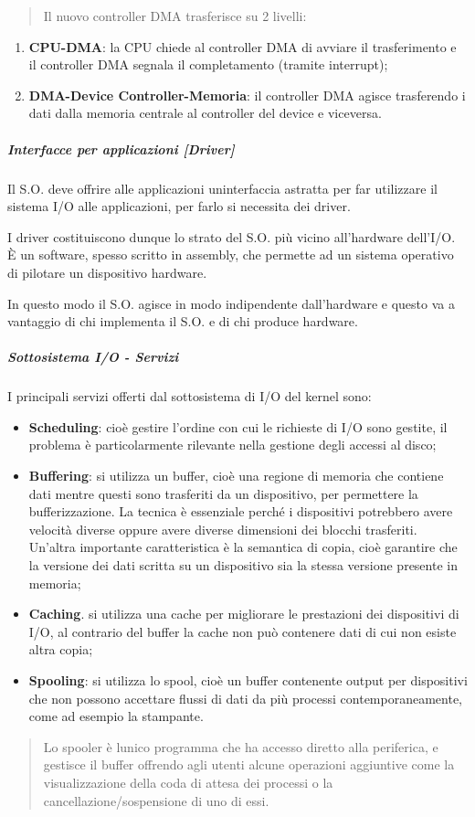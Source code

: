 \begin{quote}
Il nuovo controller DMA trasferisce su 2 livelli:
\end{quote}

\begin{enumerate}
\def\labelenumi{\arabic{enumi}.}
\item
  \textbf{CPU-DMA}: la CPU chiede al controller DMA di avviare il
  trasferimento e il controller DMA segnala il completamento (tramite
  interrupt);
\item
  \textbf{DMA-Device Controller-Memoria}: il controller DMA agisce
  trasferendo i dati dalla memoria centrale al controller del device e
  viceversa.
\end{enumerate}

\subparagraph{Interfacce per applicazioni
{[}Driver{]}}\label{interfacce-per-applicazioni-driver}

Il S.O. deve offrire alle applicazioni un\textquotesingle interfaccia
astratta per far utilizzare il sistema I/O alle applicazioni, per farlo
si necessita dei driver.

I driver costituiscono dunque lo strato del S.O. più vicino all'hardware
dell'I/O. È un software, spesso scritto in assembly, che permette ad un
sistema operativo di pilotare un dispositivo hardware.

In questo modo il S.O. agisce in modo indipendente dall'hardware e
questo va a vantaggio di chi implementa il S.O. e di chi produce
hardware.

\subparagraph{Sottosistema I/O -
Servizi}\label{sottosistema-io---servizi}

I principali servizi offerti dal sottosistema di I/O del kernel sono:

\begin{itemize}
\item
  \textbf{Scheduling}: cioè gestire l'ordine con cui le richieste di I/O
  sono gestite, il problema è particolarmente rilevante nella gestione
  degli accessi al disco;
\item
  \textbf{Buffering}: si utilizza un buffer, cioè una regione di memoria
  che contiene dati mentre questi sono trasferiti da un dispositivo, per
  permettere la bufferizzazione. La tecnica è essenziale perché i
  dispositivi potrebbero avere velocità diverse oppure avere diverse
  dimensioni dei blocchi trasferiti. Un'altra importante caratteristica
  è la semantica di copia, cioè garantire che la versione dei dati
  scritta su un dispositivo sia la stessa versione presente in memoria;
\item
  \textbf{Caching}. si utilizza una cache per migliorare le prestazioni
  dei dispositivi di I/O, al contrario del buffer la cache non può
  contenere dati di cui non esiste altra copia;
\item
  \textbf{Spooling}: si utilizza lo spool, cioè un buffer contenente
  output per dispositivi che non possono accettare flussi di dati da più
  processi contemporaneamente, come ad esempio la stampante.
\end{itemize}

\begin{quote}
Lo spooler è l\textquotesingle unico programma che ha accesso diretto
alla periferica, e gestisce il buffer offrendo agli utenti alcune
operazioni aggiuntive come la visualizzazione della coda di attesa dei
processi o la cancellazione/sospensione di uno di essi.
\end{quote}
